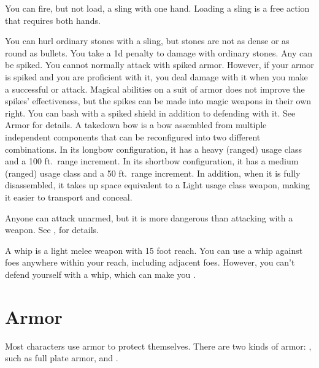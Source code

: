          You can fire, but not load, a sling with one hand. Loading a sling is a free action that requires both hands.
        \par You can hurl ordinary stones with a sling, but stones are not as dense or as round as bullets. You take a \minus1d penalty to damage with ordinary stones.
         Any  can be spiked.
        You cannot normally attack with spiked armor.
        However, if your armor is spiked and you are proficient with it, you deal damage with it when you make a successful  or  attack.
        Magical abilities on a suit of armor does not improve the spikes' effectiveness, but the spikes can be made into magic weapons in their own right.
         You can bash with a spiked shield in addition to defending with it. See Armor for details.
         A takedown bow is a bow assembled from multiple independent components that can be reconfigured into two different combinations.
        In its longbow configuration, it has a heavy (ranged) usage class and a 100 ft.\ range increment.
        In its shortbow configuration, it has a medium (ranged) usage class and a 50 ft.\ range increment.
        In addition, when it is fully disassembled, it takes up space equivalent to a Light usage class weapon, making it easier to transport and conceal.

         Anyone can attack unarmed, but it is more dangerous than attacking with a weapon. See , for details.

         A whip is a light melee weapon with 15 foot reach.
        You can use a whip against foes anywhere within your reach, including adjacent foes.
        However, you can't defend yourself with a whip, which can make you .

\section{Armor}\label{Armor}

    Most characters use armor to protect themselves. There are two kinds of armor: , such as full plate armor, and .

